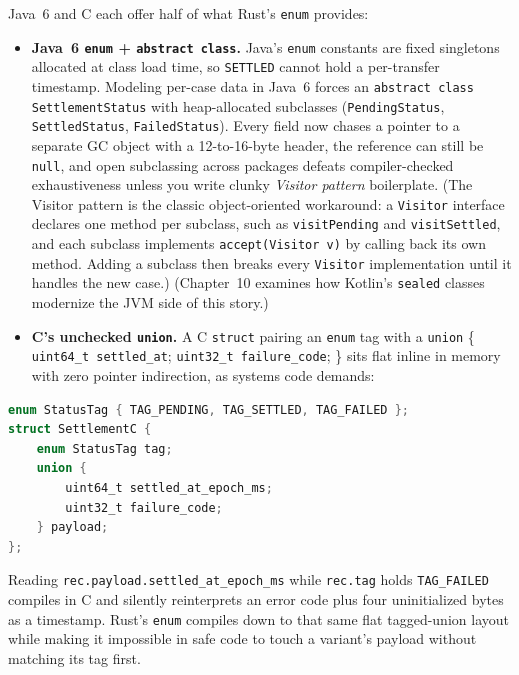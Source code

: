 Java~6 and C each offer half of what Rust's \texttt{enum} provides:
\begin{itemize}
  \item \textbf{Java~6 \texttt{enum} + \texttt{abstract class}.} Java's \texttt{enum} constants are fixed singletons allocated at class load time, so \texttt{SETTLED} cannot hold a per-transfer timestamp. Modeling per-case data in Java~6 forces an \texttt{abstract class SettlementStatus} with heap-allocated subclasses (\texttt{PendingStatus}, \texttt{SettledStatus}, \texttt{FailedStatus}). Every field now chases a pointer to a separate GC object with a 12-to-16-byte header, the reference can still be \texttt{null}, and open subclassing across packages defeats compiler-checked exhaustiveness unless you write clunky \emph{Visitor pattern} boilerplate. (The Visitor pattern is the classic object-oriented workaround: a \texttt{Visitor} interface declares one method per subclass, such as \texttt{visitPending} and \texttt{visitSettled}, and each subclass implements \texttt{accept(Visitor v)} by calling back its own method. Adding a subclass then breaks every \texttt{Visitor} implementation until it handles the new case.) (Chapter~10 examines how Kotlin's \texttt{sealed} classes modernize the JVM side of this story.)
  \item \textbf{C's unchecked \texttt{union}.} A C \texttt{struct} pairing an \texttt{enum} tag with a \texttt{union} \{ \texttt{uint64\_t settled\_at}; \texttt{uint32\_t failure\_code}; \} sits flat inline in memory with zero pointer indirection, as systems code demands:
\end{itemize}

\begin{lstlisting}[language=C]
enum StatusTag { TAG_PENDING, TAG_SETTLED, TAG_FAILED };
struct SettlementC {
    enum StatusTag tag;
    union {
        uint64_t settled_at_epoch_ms;
        uint32_t failure_code;
    } payload;
};
\end{lstlisting}

Reading \texttt{rec.payload.settled\_at\_epoch\_ms} while \texttt{rec.tag} holds \texttt{TAG\_FAILED} compiles in C and silently reinterprets an error code plus four uninitialized bytes as a timestamp. Rust's \texttt{enum} compiles down to that same flat tagged-union layout while making it impossible in safe code to touch a variant's payload without matching its tag first.

